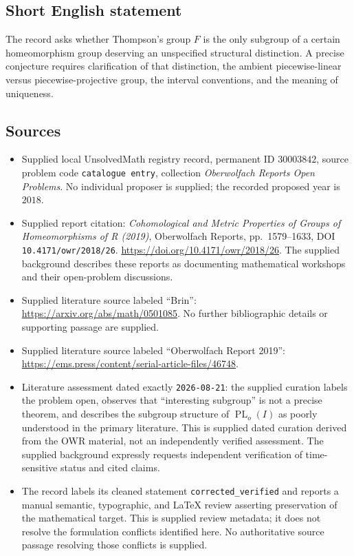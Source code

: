 \documentclass[11pt]{article}
\begin{document}
\subsection{Short English statement}
The record asks whether Thompson's group \(F\) is the only subgroup of a certain homeomorphism group deserving an unspecified structural distinction. A precise conjecture requires clarification of that distinction, the ambient piecewise-linear versus piecewise-projective group, the interval conventions, and the meaning of uniqueness.
\subsection{Sources}
\begin{itemize}
\item Supplied local UnsolvedMath registry record, permanent ID \(30003842\), source problem code \texttt{catalogue entry}, collection \emph{Oberwolfach Reports Open Problems}. No individual proposer is supplied; the recorded proposed year is \(2018\).
\item Supplied report citation: \emph{Cohomological and Metric Properties of Groups of Homeomorphisms of R (2019)}, Oberwolfach Reports, pp.~1579--1633, DOI \texttt{10.4171/owr/2018/26}. \url{https://doi.org/10.4171/owr/2018/26}. The supplied background describes these reports as documenting mathematical workshops and their open-problem discussions.
\item Supplied literature source labeled ``Brin'': \url{https://arxiv.org/abs/math/0501085}. No further bibliographic details or supporting passage are supplied.
\item Supplied literature source labeled ``Oberwolfach Report 2019'': \url{https://ems.press/content/serial-article-files/46748}.
\item Literature assessment dated exactly \texttt{2026-08-21}: the supplied curation labels the problem open, observes that ``interesting subgroup'' is not a precise theorem, and describes the subgroup structure of \(\operatorname{PL}_o(I)\) as poorly understood in the primary literature. This is supplied dated curation derived from the OWR material, not an independently verified assessment. The supplied background expressly requests independent verification of time-sensitive status and cited claims.
\item The record labels its cleaned statement \texttt{corrected\_verified} and reports a manual semantic, typographic, and LaTeX review asserting preservation of the mathematical target. This is supplied review metadata; it does not resolve the formulation conflicts identified here. No authoritative source passage resolving those conflicts is supplied.
\end{itemize}
\end{document}
